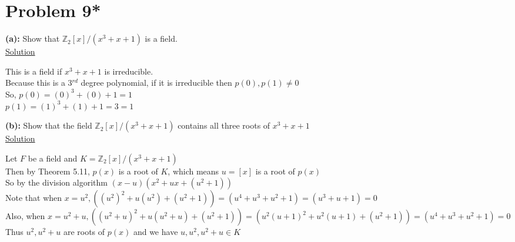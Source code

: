 \documentclass{article} %
\begin{document}
\newpage

\section*{Problem 9*}

\textbf{(a):} Show that $\mathbb{Z}_2[x]/(x^3 + x + 1)$ is a field.
\\

\underline{Solution}
\begin{addmargin}[1em]{0em}
This is a field if $x^3 + x + 1$ is irreducible.
\\Because this is a 3$^{rd}$ degree polynomial, if it is irreducible then $p(0), p(1) \neq 0$
\\So, $p(0) = (0)^3 + (0) + 1 = 1$
\\$p(1) = (1)^3 + (1) + 1 = 3 = 1$
\end{addmargin}

\textbf{(b):} Show that the field $\mathbb{Z}_2[x]/(x^3 + x + 1)$ contains all three roots of $x^3 + x + 1$
\\

\underline{Solution}
\begin{addmargin}[1em]{0em}
Let $F$ be a field and $K = \mathbb{Z}_2[x]/(x^3 + x + 1)$
\\Then by Theorem 5.11, $p(x)$ is a root of $K$, which means $u=[x]$ is a root of $p(x)$
\\So by the division algorithm $(x-u)(x^2 + ux + (u^2 + 1))$
\\Note that when $x = u^2, ((u^2)^2 + u(u^2) + (u^2 + 1)) = (u^4 + u^3 + u^2 + 1) = (u^3 + u + 1) = 0$
\\Also, when $x = u^2 + u, ((u^2 + u)^2 + u(u^2 + u) + (u^2 + 1)) = (u^2(u+1)^2 + u^2(u+1)+(u^2 + 1)) = (u^4 + u^3 + u^2 + 1) = 0$
\\Thus $u^2, u^2 + u$ are roots of $p(x)$ and we have $u, u^2, u^2 + u \in K$
\end{addmargin}

\end{document}
